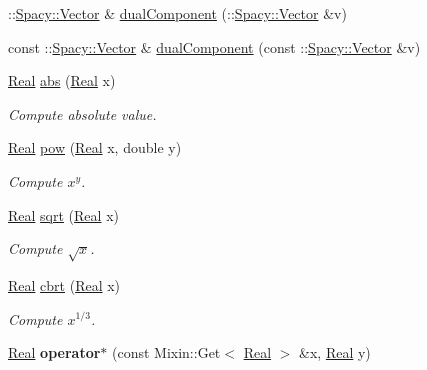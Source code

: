 \begin{DoxyCompactItemize}
\-::\hyperlink{classSpacy_1_1Vector}{\-Spacy\-::\-Vector} \& \hyperlink{group__ProductSpaceGroup_gafe51c084e3b03205db94e91309e834f7}{dual\-Component} (\-::\hyperlink{classSpacy_1_1Vector}{\-Spacy\-::\-Vector} \&v)
\item 
const \-::\hyperlink{classSpacy_1_1Vector}{\-Spacy\-::\-Vector} \& \hyperlink{group__ProductSpaceGroup_gabe5978657aab46b1575e2521b336407d}{dual\-Component} (const \-::\hyperlink{classSpacy_1_1Vector}{\-Spacy\-::\-Vector} \&v)
\item 
\hypertarget{namespaceSpacy_a89ed08f6f5a05e3f35afa37fcebf4b06}{\hyperlink{classSpacy_1_1Real}{\-Real} \hyperlink{namespaceSpacy_a89ed08f6f5a05e3f35afa37fcebf4b06}{abs} (\hyperlink{classSpacy_1_1Real}{\-Real} x)}\label{namespaceSpacy_a89ed08f6f5a05e3f35afa37fcebf4b06}

\begin{DoxyCompactList}\small\item\em \-Compute absolute value. \end{DoxyCompactList}\item 
\hypertarget{namespaceSpacy_acffef7eb409609abe7ad87aaad28503f}{\hyperlink{classSpacy_1_1Real}{\-Real} \hyperlink{namespaceSpacy_acffef7eb409609abe7ad87aaad28503f}{pow} (\hyperlink{classSpacy_1_1Real}{\-Real} x, double y)}\label{namespaceSpacy_acffef7eb409609abe7ad87aaad28503f}

\begin{DoxyCompactList}\small\item\em \-Compute $x^y$. \end{DoxyCompactList}\item 
\hypertarget{namespaceSpacy_aa779bb3e2bf547cd0ed9ef47b3d711a3}{\hyperlink{classSpacy_1_1Real}{\-Real} \hyperlink{namespaceSpacy_aa779bb3e2bf547cd0ed9ef47b3d711a3}{sqrt} (\hyperlink{classSpacy_1_1Real}{\-Real} x)}\label{namespaceSpacy_aa779bb3e2bf547cd0ed9ef47b3d711a3}

\begin{DoxyCompactList}\small\item\em \-Compute $\sqrt{x}$. \end{DoxyCompactList}\item 
\hypertarget{namespaceSpacy_a64093cc47f73b71ba92bc0dd37e9572b}{\hyperlink{classSpacy_1_1Real}{\-Real} \hyperlink{namespaceSpacy_a64093cc47f73b71ba92bc0dd37e9572b}{cbrt} (\hyperlink{classSpacy_1_1Real}{\-Real} x)}\label{namespaceSpacy_a64093cc47f73b71ba92bc0dd37e9572b}

\begin{DoxyCompactList}\small\item\em \-Compute $ x^{1/3} $. \end{DoxyCompactList}\item 
\hypertarget{namespaceSpacy_a2408a53b27498ddeb762c52b51b71905}{\hyperlink{classSpacy_1_1Real}{\-Real} {\bfseries operator$\ast$} (const \-Mixin\-::\-Get$<$ \hyperlink{classSpacy_1_1Real}{\-Real} $>$ \&x, \hyperlink{classSpacy_1_1Real}{\-Real} y)}\label{namespaceSpacy_a2408a53b27498ddeb762c52b51b71905}


\end{DoxyCompactItemize}
